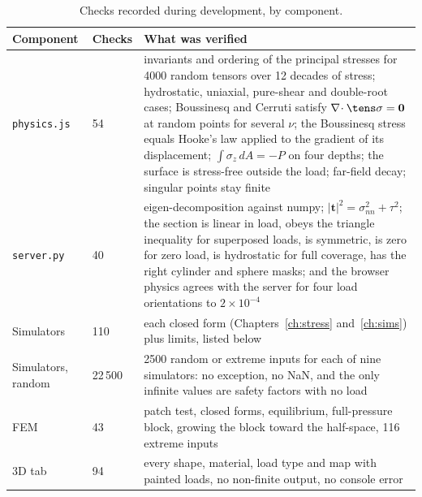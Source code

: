 \begin{table}[H]\centering\small
\caption{Checks recorded during development, by component.}\label{tab:checks}
\begin{tabular}{@{}p{3.1cm}p{1.9cm}p{9.8cm}@{}}\toprule
Component & Checks & What was verified\\\midrule
\texttt{physics.js} & 54 & invariants and ordering of the principal stresses for 4000 random tensors over 12 decades of stress; hydrostatic, uniaxial, pure-shear and double-root cases; Boussinesq and Cerruti satisfy $\nabla\!\cdot\tens\sigma=\mathbf0$ at random points for several $\nu$; the Boussinesq stress equals Hooke's law applied to the gradient of its displacement; $\int\sigma_z\,dA=-P$ on four depths; the surface is stress-free outside the load; far-field decay; singular points stay finite\\
\texttt{server.py} & 40 & eigen-decomposition against numpy; $|\mathbf t|^2=\sigma_{nn}^2+\tau^2$; the section is linear in load, obeys the triangle inequality for superposed loads, is symmetric, is zero for zero load, is hydrostatic for full coverage, has the right cylinder and sphere masks; and the browser physics agrees with the server for four load orientations to $2\times10^{-4}$\\
Simulators & 110 & each closed form (Chapters~\ref{ch:stress} and~\ref{ch:sims}) plus limits, listed below\\
Simulators, random & 22\,500 & 2500 random or extreme inputs for each of nine simulators: no exception, no NaN, and the only infinite values are safety factors with no load\\
FEM & 43 & patch test, closed forms, equilibrium, full-pressure block, growing the block toward the half-space, 116 extreme inputs\\
3D tab & 94 & every shape, material, load type and map with painted loads, no non-finite output, no console error\\\bottomrule
\end{tabular}
\end{table}

